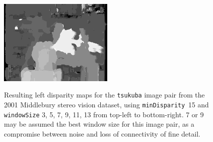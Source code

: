 \documentclass[english, paper=a4]{scrartcl}
\begin{document}
\begin{figure}[H]
\label{fig:tsukuba_result_left_winsize11_mindisp15}
\includegraphics[width=0.49\textwidth]{tsukuba_result_left_winsize13_mindisp15.png}
\label{fig:tsukuba_result_left_winsize13_mindisp15}
\caption{Resulting left disparity maps for the \texttt{tsukuba} image pair from the 2001 Middlebury stereo vision dataset, using \texttt{minDisparity}~15 and \texttt{windowSize} 3, 5, 7, 9, 11, 13 from top-left to bottom-right. 7 or 9 may be assumed the best window size for this image pair, as a compromise between noise and loss of connectivity of fine detail.}
\end{figure}
\end{document}
